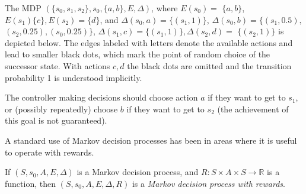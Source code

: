 \begin{example}
    \label{ex_mdp}
    The MDP $(\{s_0, s_1, s_2\}, s_0, \{a, b\}, E, \Delta)$,
    where
    $E(s_0) =$ \linebreak $\{a,b\}$,
    $E(s_1) \{c\}, E(s_2) = \{d\}$,
    and $\Delta(s_0, a) = \{(s_1, 1)\}$,
    $\Delta(s_0, b) = \{(s_1, 0.5),$ $(s_2,0.25), (s_0,0.25)\}$,
    $\Delta(s_1,c) = \{(s_1,1)\},
    \Delta(s_2,d) = $ \linebreak $ \{(s_2,1)\}$
    is depicted below.
    The edges labeled with letters denote the available actions
    and lead to smaller black dots, which mark the point of random
    choice of the successor state. With actions $c,d$ the black dots are
    omitted and the transition probability 1 is understood implicitly.

    The controller making decisions should choose action $a$ if
    they want to get to $s_1$, or (possibly repeatedly) choose $b$ if
    they want to get to $s_2$ (the achievement of this goal is not
    guaranteed).

\hfill \break
\centering
{}

\end{example}

A standard use of Markov decision processes has been in areas where it
is useful to operate with rewards.

\begin{definition}
If $(S, s_0, A, E, \Delta)$ is a Markov decision process,
and \linebreak $R : S \times A \times S \to \mathbb{R}$ is a function,
then $(S, s_0, A,E,\Delta,R)$ is a {\em Markov decision process with rewards}.
\end{definition}


